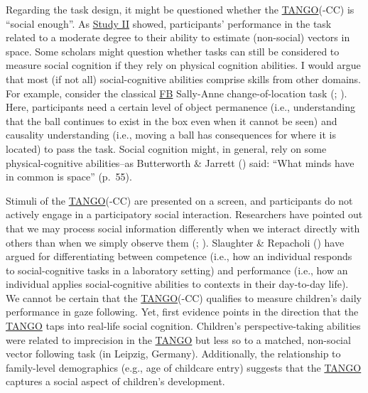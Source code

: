 \documentclass[
]{scrbook}
\begin{document}
Regarding the task design, it might be questioned whether the \hyperref[acronyms_TANGO]{TANGO}(-CC) is ``social enough''. As \hyperref[studyII]{Study II} showed, participants' performance in the task related to a moderate degree to their ability to estimate (non-social) vectors in space. Some scholars might question whether tasks can still be considered to measure social cognition if they rely on physical cognition abilities. I would argue that most (if not all) social-cognitive abilities comprise skills from other domains. For example, consider the classical \hyperref[acronyms_FB]{FB} Sally-Anne change-of-location task (; ). Here, participants need a certain level of object permanence (i.e., understanding that the ball continues to exist in the box even when it cannot be seen) and causality understanding (i.e., moving a ball has consequences for where it is located) to pass the task. Social cognition might, in general, rely on some physical-cognitive abilities\thinspace --\thinspace as Butterworth \& Jarrett () said: ``What minds have in common is space'' (p.~55).

Stimuli of the \hyperref[acronyms_TANGO]{TANGO}(-CC) are presented on a screen, and participants do not actively engage in a participatory social interaction. Researchers have pointed out that we may process social information differently when we interact directly with others than when we simply observe them (; ). Slaughter \& Repacholi () have argued for differentiating between competence (i.e., how an individual responds to social-cognitive tasks in a laboratory setting) and performance (i.e., how an individual applies social-cognitive abilities to contexts in their day-to-day life). We cannot be certain that the \hyperref[acronyms_TANGO]{TANGO}(-CC) qualifies to measure children's daily performance in gaze following. Yet, first evidence points in the direction that the \hyperref[acronyms_TANGO]{TANGO} taps into real-life social cognition. Children's perspective-taking abilities were related to imprecision in the \hyperref[acronyms_TANGO]{TANGO} but less so to a matched, non-social vector following task (in Leipzig, Germany). Additionally, the relationship to family-level demographics (e.g., age of childcare entry) suggests that the \hyperref[acronyms_TANGO]{TANGO} captures a social aspect of children's development.
\end{document}
